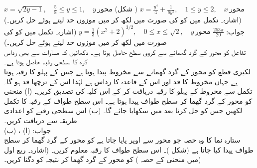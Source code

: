 $x=\sqrt{2y-1},\quad \tfrac{5}{8}\le y\le 1,\quad y\,\text{محور}$
\quad
(شکل )
$x=\tfrac{y^4}{4}+\tfrac{1}{8y^2},\quad 1\le y\le 2,\quad x\,\text{محور}$
\quad
(اشارہ۔ تکمل میں  کو  کی صورت میں لکھ کر  میں موزوں حد لیتے ہوئے حل کریں۔)\\
جواب:\quad
$\tfrac{253\pi}{20}$
$y=\tfrac{1}{3}(x^2+2)^{3/2},\quad 0\le x\le \sqrt{2},\quad y\,\text{محور}$
\quad
(اشارہ۔ تکمل میں  کو  کی صورت میں لکھ کر  میں موزوں حد لیتے ہوئے حل کریں۔)
\\
تفاعل  کو  محور کے گرد گھمانے سے کروی سطح حاصل ہوتا ہے۔ دکھائیں کہ مساوات  سے بھی رداس  کرہ کا سطحی رقبہ  حاصل ہوتا ہے۔
\\
لکیری قطع  کو  محور کے گرد گھمانے سے مخروط پیدا ہوتا ہے جس کے پہلو کا رقبہ  ہوتا ہے جہاں مخروط کا قد  اور اس کے قاعدہ کا رداس  ہے لہٰذا اس کے ترچھا قد  ہو گا۔ تکمل سے مخروط کے پہلو کا رقبہ دریافت کر کے اس کلیہ کی تصدیق کریں۔ 
   (ا) منحنی  کو  محور کے گرد گھما کر سطح طواف پیدا ہوتا ہے۔ اس سطح طواف کے رقبہ کا تکمل لکھیں جس کو حل کرنا بعد میں سکھایا جائے گا۔ (ب) اس سطحی رقبے کو اعدادی طریقہ سے دریافت کریں۔\\
جواب:\quad
(ا) ، (ب) 
\\
ستارہ نما  کا وہ حصہ جو  محور سے اوپر پایا جاتا ہے کو  محور کے گرد گھما کر سطح طواف پیدا کیا جاتا ہے (شکل )۔ اس سطح طواف کا رقبہ معلوم کریں۔ (اشارہ۔ ربع اول میں منحنی کے حصہ ) کو  محور کے گرد گھما کر نتیجہ  کو دگنا کریں۔)
